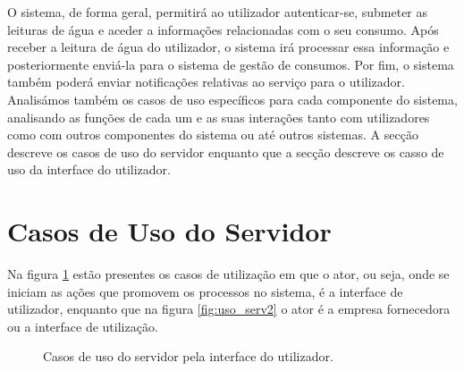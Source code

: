 O sistema, de forma geral, permitirá ao utilizador autenticar-se, submeter as leituras de água e aceder a informações relacionadas com o seu consumo. Após receber a leitura de água do utilizador, o sistema irá processar essa informação e posteriormente enviá-la para o sistema de gestão de consumos. Por fim, o sistema também poderá enviar notificações relativas ao serviço para o utilizador.\\
Analisámos também os casos de uso específicos para cada componente do sistema, analisando as funções de cada um e as suas interações tanto com utilizadores como com outros componentes do sistema ou até outros sistemas. A secção \label{sec:casos_servidor} descreve os casos de uso do servidor enquanto que a secção \label{sec:casos_iu} descreve os casso de uso da interface do utilizador.

\section{Casos de Uso do Servidor} \label{sec:casos_servidor}
Na figura \ref{fig:uso_serv1} estão presentes os casos de utilização em que o ator, ou seja, onde se iniciam as ações que promovem os processos no sistema, é a interface de utilizador, enquanto que na figura \ref{fig:uso_serv2} o ator é a empresa fornecedora ou a interface de utilização.

\vspace{2cm} %

\begin{figure}[h!]
\begin{center}
\caption{Casos de uso do servidor pela interface do utilizador.}
\label{fig:uso_serv1}
\end{center}
\end{figure}


